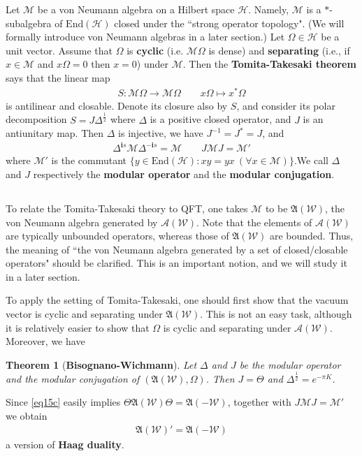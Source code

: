 \documentclass[12pt,b5paper,notitlepage]{article}
\theoremstyle{definition}
\theoremstyle{plain}
\newtheorem{thm}[df]{Theorem}
\newcommand{\fk}{\mathfrak}
\newcommand{\mc}{\mathcal}
\newcommand{\End}{\mathrm{End}} %
\newcommand{\scr}{\mathscr}
\newcommand{\im}{\mathbf{i}}
\numberwithin{equation}{section}
\begin{document}
Let $\mc M$ be a von Neumann algebra on a Hilbert space $\mc H$. Namely, $\mc M$ is a $*$-subalgebra of $\End(\mc H)$ closed under the ``strong operator topology". (We will formally introduce von Neumann algebras in a later section.) Let $\Omega\in\mc H$ be a unit vector. Assume that $\Omega$ is \textbf{cyclic} (i.e. $\mc M\Omega$ is dense) and \textbf{separating} (i.e., if $x\in\mc M$ and $x\Omega=0$ then $x=0$) under $\mc M$. Then the \textbf{Tomita-Takesaki theorem} says that the linear map
\begin{align*}
S:\mc M\Omega\rightarrow\mc M\Omega\qquad x\Omega\mapsto x^*\Omega
\end{align*}
is antilinear and closable. Denote its closure also by $S$, and consider its polar decomposition $S=J\Delta^{\frac 12}$ where $\Delta$ is a positive closed operator, and $J$ is an antiunitary map. Then $\Delta$ is injective, we have $J^{-1}=J^*=J$, and
\begin{align*}
\Delta^{\im s}\mc M\Delta^{-\im s}=\mc M\qquad J\mc MJ=\mc M'
\end{align*}
where $\mc M'$ is the commutant $\{y\in\End(\mc H):xy=yx~(\forall x\in\mc M)\}$.We call $\Delta$ and $J$ respectively the \textbf{modular operator} and the \textbf{modular conjugation}.



\subsection{}



To relate the Tomita-Takesaki theory to QFT, one takes $\mc M$ to be $\fk A(\mc W)$, the von Neumann algebra generated by $\scr A(\mc W)$. Note that the elements of $\scr A(\mc W)$ are typically unbounded operators, whereas those of $\fk A(\mc W)$ are bounded. Thus, the meaning of ``the von Neumann algebra generated by a set of closed/closable operators" should be clarified. This is an important notion, and we will study it in a later section.


To apply the setting of Tomita-Takesaki, one should first show that the vacuum vector is cyclic and separating under $\fk A(\mc W)$. This is not an easy task, although it is relatively easier to show that $\Omega$ is cyclic and separating under $\scr A(\mc W)$. Moreover, we have
\begin{thm}[\textbf{Bisognano-Wichmann}]
Let $\Delta$ and $J$ be the modular operator and the modular conjugation of $(\fk A(\mc W),\Omega)$. Then $J=\Theta$ and $\Delta^{\frac 12}=e^{-\pi K}$.
\end{thm}
Since \eqref{eq15c} easily implies $\Theta\fk A(\mc W)\Theta=\fk A(-\mc W)$, together with $J\mc M J=\mc M'$ we obtain
\begin{align}
\fk A(\mc W)'=\fk A(-\mc W)
\end{align}
a version of \textbf{Haag duality}.
\end{document}
